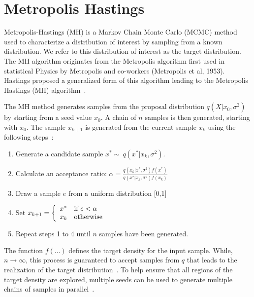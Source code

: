 \documentclass[journal]{IEEEtran}
\begin{document}
\section{Metropolis Hastings}
\label{sec:mh}

Metropolis-Hastings (MH) is a Markov Chain Monte Carlo (MCMC) method used to characterize a distribution of interest by sampling from a known distribution. We refer to this distribution of interest as the target distribution. The MH algorithm originates from the Metropolis algorithm first used in statistical Physics by Metropolis and co-workers (Metropolis et al, 1953)\cite{metropolis1953equation}. Hastings proposed a generalized form of this algorithm leading to the Metropolis Hastings (MH) algorithm~\cite{hastings1970monte}.

The MH method generates samples from the proposal distribution $q(X|x_{0},\sigma^{2})$ by starting from a seed value $x_{0}$. A chain of $n$ samples is then generated, starting with $x_{0}$. The sample $x_{k+1}$ is generated from the current sample $x_{k}$ using the following steps~\cite{IVAN}:

\begin{enumerate}
  \item Generate a candidate sample $x^{*} \sim{~} q(x^{*}|x_{k}, \sigma^{2})$.
  \item Calculate an acceptance ratio: $\alpha = \frac{q(x_{k}|x^{*},\sigma^{2})f(x^{*})}{q(x^{*}|x_{k},\sigma^{2})f(x_{k})}$ 
	\item Draw a sample $e$ from a uniform distribution [0,1]	
  \item Set $ x_{k+1} = 
												\left \{ \begin{array}{l l}
																		x^{*} & \text{if} \ e < \alpha \\
																		x_{k} & \text{otherwise} 
																	\end{array} \right .$
						
	\item Repeat steps 1 to 4 until $n$ samples have been generated.
\end{enumerate}

\noindent The function $f(...)$ defines the target density for the input sample. While, $n \rightarrow \infty$, this process is guaranteed to accept samples from $q$ that leads to the realization of the target distribution~\cite{robert2004metropolis}. To help ensure that all regions of the target density are explored, multiple seeds can be used to generate multiple chains of samples in parallel~\cite{IVAN}.
\end{document}
